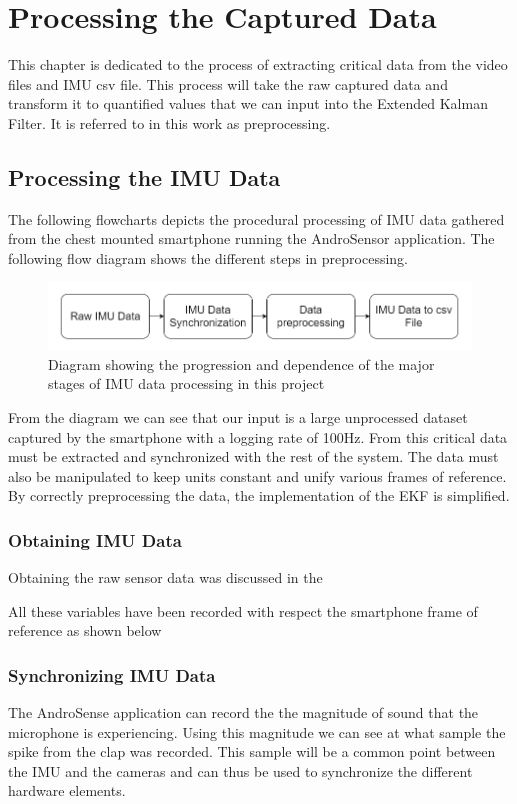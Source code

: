 \chapter{Processing the Captured Data}
This chapter is dedicated to the process of extracting critical data from the video files and IMU csv file. This process will take the raw captured data and transform it to quantified values that we can input into the Extended Kalman Filter. It is referred to in this work as preprocessing.  

\section{Processing the IMU Data}
The following flowcharts depicts the procedural processing of IMU data gathered from the chest mounted smartphone running the AndroSensor application. The following flow diagram shows the different steps in preprocessing.

\begin{figure}[!ht]
\captionsetup{width=0.8\linewidth, font=small}  
\includegraphics[width=\linewidth]{figures/imuflow.png}
\caption{Diagram showing the progression and dependence of the major stages of IMU data processing in this project}
\label{fig:imuflow}
\end{figure}

From the diagram we can see that our input is a large unprocessed dataset captured by the smartphone with a logging rate of 100Hz. From this critical data must be extracted and synchronized with the rest of the system. The data must also be manipulated to keep units constant and unify various frames of reference. By correctly preprocessing the data, the implementation of the EKF is simplified.

\subsection{Obtaining IMU Data}
Obtaining the raw sensor data was discussed in the 


All these variables have been recorded with respect the smartphone frame of reference as shown below



\subsection{Synchronizing IMU Data}
The AndroSense application can record the the magnitude of sound that the microphone is experiencing. Using this magnitude we can see at what sample the spike from the clap was recorded. This sample will be a common point between the IMU and the cameras and can thus be used to synchronize the different hardware elements.

